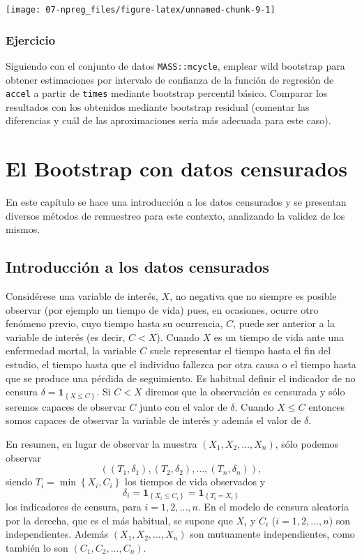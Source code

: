 \documentclass[]{book}
\theoremstyle{break}
\theoremstyle{definition}
\theoremstyle{definition}
\theoremstyle{definition}
\theoremstyle{remark}
\begin{document}
\begin{center}\texttt{[image: 07-npreg\_files/figure-latex/unnamed-chunk-9-1]} \end{center}

\subsection{Ejercicio}\label{ejercicio-1}

Siguiendo con el conjunto de datos \texttt{MASS::mcycle}, emplear wild
bootstrap para obtener estimaciones por intervalo de confianza de la
función de regresión de \texttt{accel} a partir de \texttt{times}
mediante bootstrap percentil básico. Comparar los resultados con los
obtenidos mediante bootstrap residual (comentar las diferencias y cuál
de las aproximaciones sería más adecuada para este caso).

\chapter{El Bootstrap con datos censurados}\label{bootcen}

En este capítulo se hace una introducción a los datos censurados y se
presentan diversos métodos de remuestreo para este contexto, analizando
la validez de los mismos.

\section{Introducción a los datos
censurados}\label{introducciuxf3n-a-los-datos-censurados}

Considérese una variable de interés, \(X\), no negativa que no siempre
es posible observar (por ejemplo un tiempo de vida) pues, en ocasiones,
ocurre otro fenómeno previo, cuyo tiempo hasta su ocurrencia, \(C\),
puede ser anterior a la variable de interés (es decir, \(C<X\)). Cuando
\(X\) es un tiempo de vida ante una enfermedad mortal, la variable \(C\)
suele representar el tiempo hasta el fin del estudio, el tiempo hasta
que el individuo fallezca por otra causa o el tiempo hasta que se
produce una pérdida de seguimiento. Es habitual definir el indicador de
no censura \(\delta =\mathbf{1}_{\left\{ X\leq C\right\} }\). Si \(C<X\)
diremos que la observación es censurada y sólo seremos capaces de
observar \(C\) junto con el valor de \(\delta\). Cuando \(X\leq C\)
entonces somos capaces de observar la variable de interés y además el
valor de \(\delta\).

En resumen, en lugar de observar la muestra
\(\left( X_1, X_2, \ldots, X_n \right)\), sólo podemos observar
\[\left( \left( T_1, \delta _1 \right), \left( T_2, \delta _2 \right),
\ldots ,\left( T_n, \delta_n \right) \right),\] siendo
\(T_i=\min \left\{ X_i,C_i\right\}\) los tiempos de vida observados y
\[\delta _i=\mathbf{1}_{\left\{ X_i\leq
C_i\right\} }=\mathbf{1}_{\left\{ T_i=X_i\right\} }\] los indicadores de
censura, para \(i=1,2,\ldots ,n\). En el modelo de censura aleatoria por
la derecha, que es el más habitual, se supone que \(X_i\) y \(C_i\)
(\(i=1,2,\ldots ,n\)) son independientes. Además
\(\left( X_1, X_2, \ldots ,X_n \right)\) son mutuamente independientes,
como también lo son \(\left( C_1, C_2,\ldots ,C_n \right)\).
\end{document}
